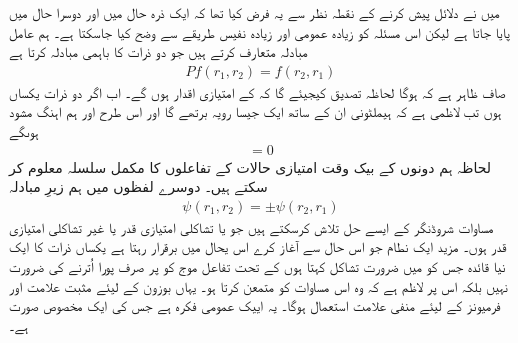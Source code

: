 میں نے دلائل پیش کرنے کے نقطہ نظر سے یہ فرض کیا تھا کہ ایک ذرہ حال  میں اور دوسرا حال  میں پایا جاتا ہے لیکن اس مسئلہ کو زیادہ عمومی اور زیادہ نفیس طریقے سے وضح کیا جاسکتا ہے۔ ہم عامل مبادلہ  متعارف کرتے ہیں جو دو ذرات کا باہمی مبادلہ کرتا ہے
\begin{align}
	Pf(r_1, r_2)=f(r_2, r_1)
\end{align}
صاف ظاہر ہے کہ  ہوگا لحاظہ تصدیق کیجیئے گا کہ  کے امتیازی اقدار  ہوں گے۔ اب اگر دو ذرات یکساں ہوں تب لاظمی ہے کہ ہیملٹونی ان کے ساتھ ایک جیسا رویہ برتھے گا  اور  اس طرح  اور  ہم اہنگ مشود ہوںگے
\begin{align}
	[P, H]=0
\end{align}
لحاظہ ہم دونوں کے بیک وقت امتیازی حالات کے تفاعلوں کا مکمل سلسلہ معلوم کر سکتے ہیں۔ دوسرے لفظوں میں ہم زیرِ مبادلہ 
\begin{align}
	\psi(r_1, r_2)=\pm\psi(r_2, r_1)
\end{align}
مساوات شروڈنگر کے ایسے حل تلاش کرسکتے ہیں جو یا تشاکلی امتیازی قدر  یا غیر تشاکلی امتیازی قدر  ہوں۔ مزید ایک نطام جو اس حال سے آغاز کرے اس یحال میں برقرار رہتا ہے یکساں ذرات کا ایک نیا قائدہ جس کو میں ضرورت تشاکل کہتا ہوں کے تحت تفاعل موج کو  پر صرف پورا اُترنے کی ضرورت نہیں بلکہ اس پر لاظم ہے کہ وہ اس مساوات کو متمعن کرتا ہو۔ یہاں بوزون کے لیئے مثبت علامت اور فرمیونز کے لیئے منفی علامت استعمال ہوگا۔ یہ اییک عمومی فکرہ ہے جس کی  ایک مخصوص صورت ہے۔





